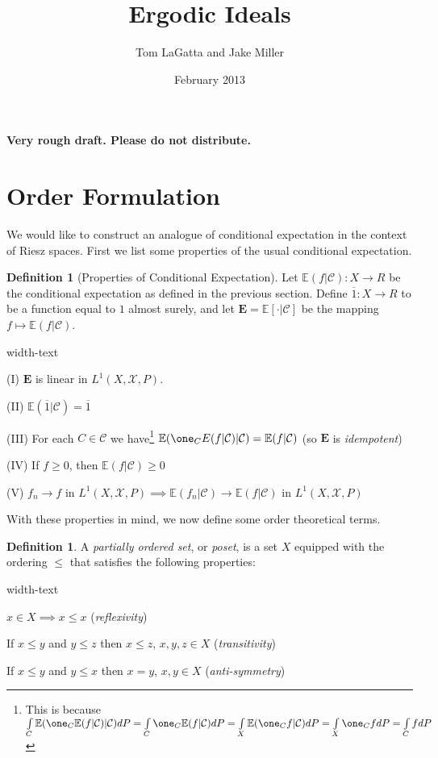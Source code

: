 \documentclass[letterpaper,10pt,oneside,onecolumn,reqno]{amsart}
\author{Tom LaGatta and Jake Miller}
\title{Ergodic Ideals}
\date{February 2013}
\newcommand{\C}{\mathcal C}
\newcommand{\E}{\mathbb E}
\newcommand{\X}{\mathcal X}
\theoremstyle{definition}
\newtheorem{defn}[thm]{Definition}
\renewcommand{\bar}[1]{\overline{#1}}
\begin{document}
\maketitle

	\textbf{Very rough draft. Please do not distribute.}

\section{Order Formulation}
\label{sec:order-formulation}
We would like to construct an analogue of conditional expectation in the context of Riesz spaces. First we list some properties of the usual conditional expectation.

\begin{defn}[Properties of Conditional Expectation]
\label{def:1}
Let $\E(f|\C) : X \to R$ be the conditional expectation as defined in the previous section. Define $\bar{1} : X \to R$ to be a function equal to $1$ almost surely, and let $\mathbf{E}=\E[\cdot|\C]$ be the mapping $f \mapsto \E(f|\C)$.
\begin{deflist}{width-text}
\item[(I)] $\mathbf{E}$ is linear in $L^1(X,\X,P)$. 
\item[(II)] $\E(\bar{1}|\C) = \bar{1}$
\item[(III)] For each $C \in \C$ we have\footnote{This is because $\int\limits_C\E(\one_C \E(f|\C)|\C)dP=\int\limits_C \one_C \E(f|\C)dP=\int\limits_X \E(\one_C f | \C)dP=\int\limits_X \one_C fdP=\int\limits_C fdP$ \label{fn:3}} $\E(\one_C E(f|\C)|\C) = \E(f|\C)$ (so $\mathbf{E}$ is \emph{idempotent}) 
\item[(IV)] If $f \geq 0$, then $\E(f|\C) \geq 0$
\item[(V)] $f_n \rightarrow f$ in $L^1(X,\X,P) \implies \E(f_n|\C) \rightarrow \E(f|\C)$ in $L^1(X,\X,P)$
\end{deflist}
\end{defn}

With these properties in mind, we now define some order theoretical terms.

\begin{defn}\label{def:2}
A \emph{partially ordered set}, or \emph{poset}, is a set $X$ equipped with the ordering $\leq$ that satisfies the following properties:

\begin{deflist}{width-text}
\item $x \in X \implies x \leq x$ (\emph{reflexivity})
\item If $x \leq y$ and $y \leq z$ then $x \leq z$, $x,y,z \in X$ (\emph{transitivity})
\item If $x \leq y$ and $y \leq x$ then $x = y$, $x,y \in X$ (\emph{anti-symmetry})
\end{deflist}
\end{defn}
\end{document}
